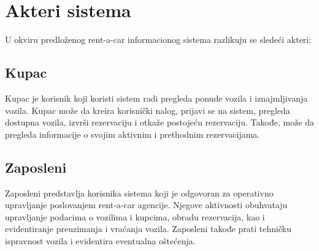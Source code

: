 
\section{Akteri sistema}

U okviru predloženog rent-a-car informacionog sistema
razlikuju se sledeći akteri:

\subsection{Kupac}

Kupac je korisnik koji koristi sistem radi pregleda ponude
vozila i iznajmljivanja vozila. Kupac može da kreira
korisnički nalog, prijavi se na sistem, pregleda dostupna
vozila, izvrši rezervaciju i otkaže postojeću rezervaciju.
Takođe, može da pregleda informacije o svojim aktivnim i
prethodnim rezervacijama.

\subsection{Zaposleni}

Zaposleni predstavlja korisnika sistema koji je odgovoran
za operativno upravljanje poslovanjem rent-a-car agencije.
Njegove aktivnosti obuhvataju upravljanje podacima o
vozilima i kupcima, obradu rezervacija, kao i evidentiranje
preuzimanja i vraćanja vozila. Zaposleni takođe prati
tehničku ispravnost vozila i evidentira eventualna oštećenja.